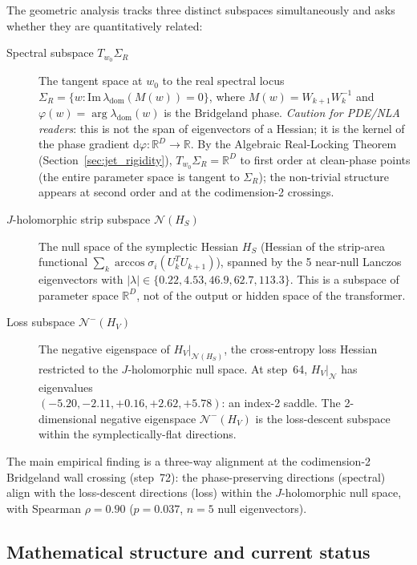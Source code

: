 \documentclass[11pt]{amsart}
\begin{document}
The geometric analysis tracks three distinct subspaces simultaneously
and asks whether they are quantitatively related:
\begin{description}
  \item[Spectral subspace $T_{w_0}\Sigma_R$]
    The tangent space at $w_0$ to the real spectral locus
    $\Sigma_R = \{w : \mathrm{Im}\,\lambda_\mathrm{dom}(M(w)) = 0\}$,
    where $M(w) = W_{k+1}W_k^{-1}$ and
    $\varphi(w) = \arg\lambda_\mathrm{dom}(w)$ is the Bridgeland phase.
    \emph{Caution for PDE/NLA readers}: this is not the span of
    eigenvectors of a Hessian; it is the kernel of the phase gradient
    $\mathrm{d}\varphi: \mathbb{R}^D \to \mathbb{R}$.
    By the Algebraic Real-Locking Theorem (Section~\ref{sec:jet_rigidity}),
    $T_{w_0}\Sigma_R = \mathbb{R}^D$ to first order at clean-phase points
    (the entire parameter space is tangent to $\Sigma_R$);
    the non-trivial structure appears at second order and at the
    codimension-2 crossings.

  \item[$J$-holomorphic strip subspace $\mathcal{N}(H_S)$]
    The null space of the symplectic Hessian $H_S$
    (Hessian of the strip-area functional
    $\sum_k \arccos\sigma_i(U_k^T U_{k+1})$),
    spanned by the 5 near-null Lanczos eigenvectors with
    $|\lambda| \in \{0.22, 4.53, 46.9, 62.7, 113.3\}$.
    This is a subspace of parameter space $\mathbb{R}^D$, not of
    the output or hidden space of the transformer.

  \item[Loss subspace $\mathcal{N}^-(H_V)$]
    The negative eigenspace of $H_V|_{\mathcal{N}(H_S)}$,
    the cross-entropy loss Hessian restricted to the $J$-holomorphic
    null space.
    At step~64, $H_V|_{\mathcal{N}}$ has eigenvalues \\
    $(-5.20, -2.11, +0.16, +2.62, +5.78)$:
    an index-2 saddle.
    The 2-dimensional negative eigenspace $\mathcal{N}^-(H_V)$ is the
    loss-descent subspace within the symplectically-flat directions.
\end{description}
The main empirical finding is a three-way alignment at the codimension-2
Bridgeland wall crossing (step~72):
the phase-preserving directions (spectral) align with the loss-descent
directions (loss) within the $J$-holomorphic null space,
with Spearman $\rho = 0.90$ ($p = 0.037$, $n = 5$ null eigenvectors).

\subsection*{Mathematical structure and current status}
\end{document}
